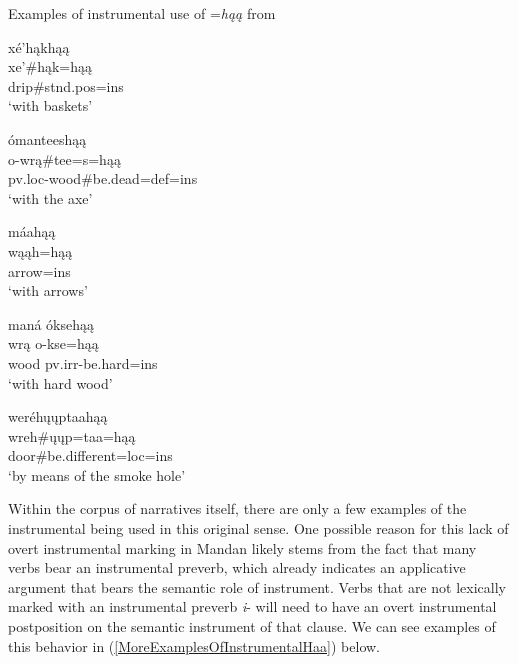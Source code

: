 \begin{exe}
\item\label{ExamplesOfInstrumentalHaa} Examples of instrumental use of =\textit{hąą} from \citet[25]{kennard1936}

\begin{xlist}
\item\label{ExamplesOfInstrumentalHaa1} \glll xé'hąkhąą\\
    xe'\#hąk=hąą\\
    \textnormal{drip}\#stnd.pos=ins\\
    \glt `with baskets'

\item\label{ExamplesOfInstrumentalHaa2} \glll ómanteeshąą\\
     o-wrą\#tee=s=hąą\\
     pv.loc-\textnormal{wood}\#\textnormal{be.dead}=def=ins\\
     \glt `with the axe'
     
\item\label{ExamplesOfInstrumentalHaa3} \glll máahąą\\
    wąąh=hąą\\
    \textnormal{arrow}=ins\\
    \glt `with arrows'

\item\label{ExamplesOfInstrumentalHaa4} \glll maná óksehąą\\
    wrą o-kse=hąą\\
    \textnormal{wood} pv.irr-\textnormal{be.hard}=ins\\
    \glt `with hard wood'
    
\item\label{ExamplesOfInstrumentalHaa5} \glll weréhųųptaahąą\\
    wreh\#ųųp=taa=hąą\\
    \textnormal{door}\#\textnormal{be.different}=loc=ins\\
    \glt `by means of the smoke hole'
    
\end{xlist}

\end{exe}

Within the corpus of narratives itself, there are only a few examples of the instrumental being used in this original sense. One possible reason for this lack of overt instrumental marking in Mandan likely stems from the fact that many verbs bear an instrumental preverb, which already indicates an applicative argument that bears the semantic role of instrument. Verbs that are not lexically marked with an instrumental preverb \textit{i}- will need to have an overt instrumental postposition on the semantic instrument of that clause. We can see examples of this behavior in (\ref{MoreExamplesOfInstrumentalHaa}) below.

